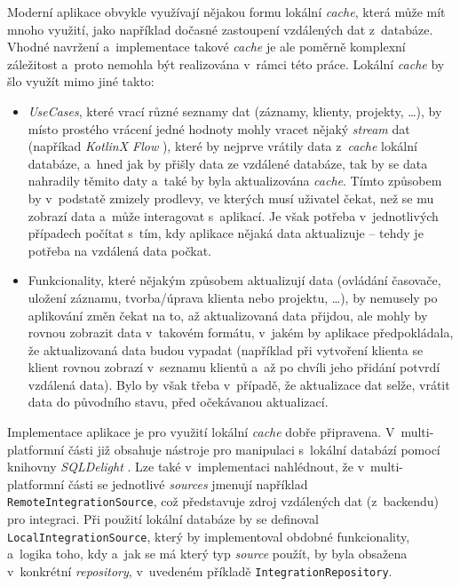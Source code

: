 Moderní aplikace obvykle využívají nějakou formu lokální \emph{cache}, která může mít mnoho využití, jako například dočasné zastoupení vzdálených dat z~databáze. Vhodné navržení a~implementace takové \emph{cache} je ale poměrně komplexní záležitost a~proto nemohla být realizována v~rámci této práce. Lokální \emph{cache} by šlo využít mimo jiné takto:
\begin{itemize}
\item{\emph{UseCases}, které vrací různé seznamy dat (záznamy, klienty, projekty, \dots), by místo prostého vrácení jedné hodnoty mohly vracet nějaký \emph{stream} dat (napříkad \emph{KotlinX Flow} \cite{kotlinx-flow}), které by nejprve vrátily data z~\emph{cache} lokální databáze, a~hned jak by přišly data ze vzdálené databáze, tak by se data nahradily těmito daty a~také by byla aktualizována \emph{cache}. Tímto způsobem by v~podstatě zmizely prodlevy, ve kterých musí uživatel čekat, než se mu zobrazí data a~může interagovat s~aplikací. Je však potřeba v~jednotlivých případech počítat s~tím, kdy aplikace nějaká data aktualizuje – tehdy je potřeba na vzdálená data počkat.}
\item{Funkcionality, které nějakým způsobem aktualizují data (ovládání časovače, uložení záznamu, tvorba/úprava klienta nebo projektu, \dots), by nemusely po aplikování změn čekat na to, až aktualizovaná data přijdou, ale mohly by rovnou zobrazit data v~takovém formátu, v~jakém by aplikace předpokládala, že aktualizovaná data budou vypadat (například při vytvoření klienta se klient rovnou zobrazí v~seznamu klientů a~až po chvíli jeho přidání potvrdí vzdálená data). Bylo by však třeba v~případě, že aktualizace dat selže, vrátit data do původního stavu, před očekávanou aktualizací.}
\end{itemize}

Implementace aplikace je pro využití lokální \emph{cache} dobře připravena. V~multi-platformní části již obsahuje nástroje pro manipulaci s~lokální databází pomocí knihovny \emph{SQLDelight} \cite{sqldelight}. Lze také v~implementaci nahlédnout, že v~multi-platformní části se jednotlivé \emph{sources} jmenují například \texttt{RemoteIntegrationSource}, což představuje zdroj vzdálených dat (z~backendu) pro integraci. Při použití lokální databáze by se definoval \texttt{LocalIntegrationSource}, který by implementoval obdobné funkcionality, a~logika toho, kdy a~jak se má který typ \emph{source} použít, by byla obsažena v~konkrétní \emph{repository}, v~uvedeném příkladě \texttt{IntegrationRepository}.

